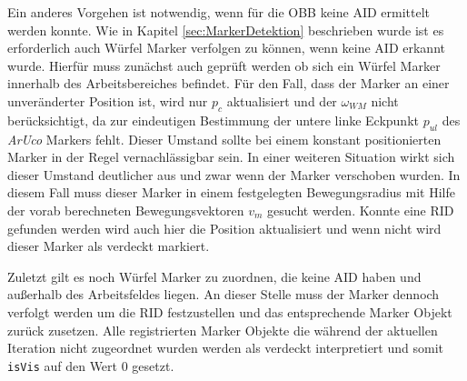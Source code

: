 Ein anderes Vorgehen ist notwendig, wenn für die OBB keine AID ermittelt werden konnte. Wie in Kapitel \ref{sec:MarkerDetektion} beschrieben wurde ist es erforderlich auch Würfel Marker verfolgen zu können, wenn keine AID erkannt wurde. Hierfür muss zunächst auch geprüft werden ob sich ein Würfel Marker innerhalb des Arbeitsbereiches befindet. Für den Fall, dass der Marker an einer unveränderter Position ist, wird nur $p_c$  aktualisiert und der $\omega_{WM}$ nicht berücksichtigt, da zur eindeutigen Bestimmung der untere linke Eckpunkt $p_{ul}$ des \textit{ArUco} Markers fehlt. Dieser Umstand sollte bei einem konstant positionierten Marker in der Regel vernachlässigbar sein. In einer weiteren Situation wirkt sich dieser Umstand deutlicher aus und zwar wenn der Marker verschoben wurden. In diesem Fall muss dieser Marker in einem festgelegten Bewegungsradius mit Hilfe der vorab berechneten Bewegungsvektoren $v_m$ gesucht werden. Konnte eine RID gefunden werden wird auch hier die Position aktualisiert und wenn nicht wird dieser Marker als verdeckt markiert.

Zuletzt gilt es noch Würfel Marker zu zuordnen, die keine AID haben und außerhalb des Arbeitsfeldes liegen. An dieser Stelle muss der Marker dennoch verfolgt werden um die RID festzustellen und das entsprechende Marker Objekt zurück zusetzen. Alle registrierten Marker Objekte die während der aktuellen Iteration nicht zugeordnet wurden werden als verdeckt interpretiert und somit \texttt{isVis} auf den Wert $0$ gesetzt.

